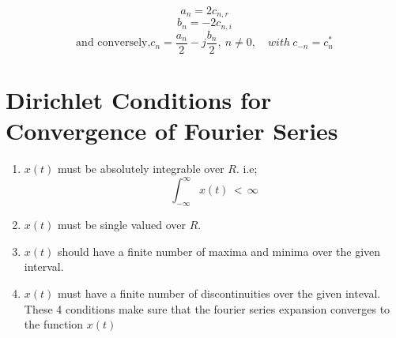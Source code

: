 \documentclass[a4paper,12pt]{book}
\begin{document}
\begingroup

\centering

\[
a_n  = 2c_{n,r} 
\]
\[b_n  = -2c_{n,i}
\]
\[ \text{and conversely,}c_n=\frac{a_n}2-j\frac{b_n}2, \ n \ne 0, \quad with \ c_{-n}=c_n^*
\]
\endgroup

\section{Dirichlet Conditions for Convergence of Fourier Series}
\begin{enumerate}
\item $x(t)$ must be absolutely integrable over $R$. i.e;
\[ \int_{-\infty}^{\infty}x(t) \, < \, \infty \]
\item $x(t)$ must be single valued over $R$.
\item $x(t)$ should have a finite number of maxima and minima over the given interval.
\item $x(t)$ must have a finite number of discontinuities over the given inteval.\bigskip\\
These 4 conditions make sure that the fourier series expansion converges to the function $x(t)$
\end{enumerate}
\end{document}
